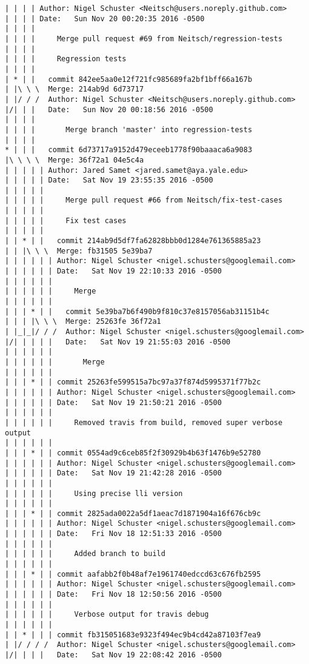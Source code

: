 \begin{lstlisting}
| | | | Author: Nigel Schuster <Neitsch@users.noreply.github.com>
| | | | Date:   Sun Nov 20 00:20:35 2016 -0500
| | | | 
| | | |     Merge pull request #69 from Neitsch/regression-tests
| | | |     
| | | |     Regression tests
| | | |       
| * | |   commit 842ee5aa0e12f721fc985689fa2bf1bff66a167b
| |\ \ \  Merge: 214ab9d 6d73717
| |/ / /  Author: Nigel Schuster <Neitsch@users.noreply.github.com>
|/| | |   Date:   Sun Nov 20 00:18:56 2016 -0500
| | | |   
| | | |       Merge branch 'master' into regression-tests
| | | |       
* | | |   commit 6d73717a9152d479eceeb1778f90baaaca6a9083
|\ \ \ \  Merge: 36f72a1 04e5c4a
| | | | | Author: Jared Samet <jared.samet@aya.yale.edu>
| | | | | Date:   Sat Nov 19 23:55:35 2016 -0500
| | | | | 
| | | | |     Merge pull request #66 from Neitsch/fix-test-cases
| | | | |     
| | | | |     Fix test cases
| | | | |        
| | * | |   commit 214ab9d5df7fa62828bbb0d1284e761365885a23
| | |\ \ \  Merge: fb31505 5e39ba7
| | | | | | Author: Nigel Schuster <nigel.schusters@googlemail.com>
| | | | | | Date:   Sat Nov 19 22:10:33 2016 -0500
| | | | | | 
| | | | | |     Merge
| | | | | |         
| | | * | |   commit 5e39ba7b6f490b9f810c37e8157056ab31151b4c
| | | |\ \ \  Merge: 25263fe 36f72a1
| |_|_|/ / /  Author: Nigel Schuster <nigel.schusters@googlemail.com>
|/| | | | |   Date:   Sat Nov 19 21:55:03 2016 -0500
| | | | | |   
| | | | | |       Merge
| | | | | |       
| | | * | | commit 25263fe599515a7bc97a37f874d5995371f77b2c
| | | | | | Author: Nigel Schuster <nigel.schusters@googlemail.com>
| | | | | | Date:   Sat Nov 19 21:50:21 2016 -0500
| | | | | | 
| | | | | |     Removed travis from build, removed super verbose output
| | | | | |       
| | | * | | commit 0554ad9c6ceb85f2f30929b4b63f1476b9e52780
| | | | | | Author: Nigel Schuster <nigel.schusters@googlemail.com>
| | | | | | Date:   Sat Nov 19 21:42:28 2016 -0500
| | | | | | 
| | | | | |     Using precise lli version
| | | | | |       
| | | * | | commit 2825ada0022a5df1aeac7d1871904a16f676cb9c
| | | | | | Author: Nigel Schuster <nigel.schusters@googlemail.com>
| | | | | | Date:   Fri Nov 18 12:51:33 2016 -0500
| | | | | | 
| | | | | |     Added branch to build
| | | | | |       
| | | * | | commit aafabb2f0b48af7e1961740edccd63c676fb2595
| | | | | | Author: Nigel Schuster <nigel.schusters@googlemail.com>
| | | | | | Date:   Fri Nov 18 12:50:56 2016 -0500
| | | | | | 
| | | | | |     Verbose output for travis debug
| | | | | |       
| | * | | | commit fb315051683e9323f494ec9b4cd42a87103f7ea9
| |/ / / /  Author: Nigel Schuster <nigel.schusters@googlemail.com>
|/| | | |   Date:   Sat Nov 19 22:08:42 2016 -0500

\end{lstlisting}
